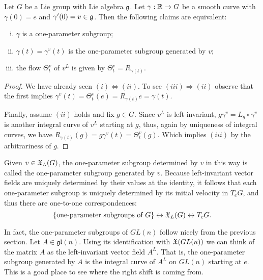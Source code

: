 \begin{proposition}
  Let $G$ be a Lie group with Lie algebra $\mathfrak{g}$.
  Let $\gamma:\mathbb{R}\to G$ be a smooth curve with $\gamma(0)=e$ and $\gamma'(0)=v\in\mathfrak{g}$. Then the following claims are equivalent:
  \begin{enumerate}[(i)]
    \item $\gamma$ is a one-parameter subgroup;
    \item $\gamma(t) = \gamma^v(t)$ is the one-parameter subgroup generated by $v$;
    \item the flow $\Theta_t^v$ of $v^L$ is given by $\Theta_t^v = R_{\gamma(t)}$.
  \end{enumerate}
\end{proposition}
\begin{proof}
  We have already seen $(i) \Leftrightarrow (ii)$.
  To see $(iii)\Rightarrow(ii)$ observe that the first implies $\gamma^v(t) = \Theta_t^v(e) = R_{\gamma(t)}e = \gamma(t)$.
  
  Finally, assume $(ii)$ holds and fix $g\in G$.
  Since $v^L$ is left-invariant, $g\gamma^v = L_g \circ \gamma^v$ is another integral curve of $v^L$ starting at $g$, thus, again by uniqueness of integral curves, we have $R_{\gamma(t)}(g) = g\gamma^v(t) = \Theta_t^v(g)$. Which implies $(iii)$ by the arbitrariness of $g$.
\end{proof}

Given $v\in\mathfrak{X}_L(G)$, the one-parameter subgroup determined by $v$ in this way is called the one-parameter subgroup generated by $v$.
Because left-invariant vector fields are uniquely determined by their values at the identity, it follows that each one-parameter subgroup is uniquely determined by its initial velocity in $T_eG$, and thus there are one-to-one correspondences:
\begin{equation}
  \{\mbox{one-parameter subgroups of }G\}
  \leftrightarrow
  \mathfrak{X}_L(G)
  \leftrightarrow
  T_e G.
\end{equation}

In fact, the one-parameter subgroups of $GL(n)$ follow nicely from the previous section.
Let $A\in\mathfrak{gl}(n)$. Using its identification with $\mathfrak{X}(GL(n))$ we can think of the matrix $A$ as the left-invariant vector field $A^L$.
That is, the one-parameter subgroup generated by $A$ is the integral curve of $A^L$ on $GL(n)$ starting at $e$.
This is a good place to see where the right shift is coming from.

